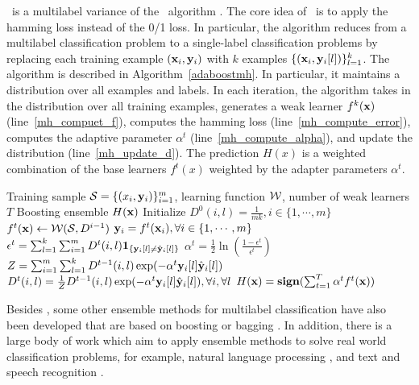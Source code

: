 {\adaboostmh\ is a multilabel variance of the \adaboost\ algorithm \citep{Schapire99improved,Esuli2008boosting}.
The core idea of \adaboostmh\ is to apply the hamming loss instead of the 0/1 loss. 
In particular, the algorithm reduces from a multilabel classification problem to a single-label classification problems by replacing each training example $(\mathbf {x}_i,\mathbf {y}_i)$ with $k$ examples $\{(\mathbf {x}_i,\mathbf {y}_i[l])\}_{l=1}^k$.
The algorithm is described in Algorithm~\ref{adaboostmh}.
In particular, it maintains a distribution over all examples and labels.
In each iteration, the algorithm takes in the distribution over all training examples, generates a weak learner $f^k(\mathbf {x})$ (line~\ref{mh_compuet_f}), computes the hamming loss (line~\ref{mh_compute_error}), computes the adaptive parameter $\alpha^t$ (line~\ref{mh_compute_alpha}), and update the distribution (line~\ref{mh_update_d}).
The prediction $H(x)$ is a weighted combination of the base learners $f^t(x)$ weighted by the adapter parameters $\alpha^t$.
\begin{algorithm}
\caption{\adaboostmh}
\label{adaboostmh}
\begin{algorithmic}[1]
	\REQUIRE Training sample $\mathcal{S} = \{(x_i,\mathbf {y}_i)\}_{i=1}^m$, learning function $\mathcal{W}$, number of weak learners $T$
	\ENSURE Boosting ensemble $H(\mathbf {x})$
	\STATE Initialize $D^0(i,l)=\frac{1}{mk},i\in\{1,\cdots,m\}$
		\STATE $f^t(\mathbf {x})\leftarrow\mathcal{W}(\mathcal{S},D^{i-1})$ \label{mh_compuet_f}
		\STATE $\mathbf {y}_i = f^t(\mathbf {x}_i),\forall i\in\{1,\cdots,m\}$
		\STATE $\epsilon^t =\sum_{l=1}^k\sum_{i=1}^{m}D^t(i,l)\mathbf{1}_{\{\mathbf {y}_i[l]\neq\hat{\mathbf {y}}_i[l]\}}$ \label{mh_compute_error}
		\STATE $\alpha^{t} = \frac{1}{2}\ln\left(\frac{1-\epsilon^t}{\epsilon^t}\right)$ \label{mh_compute_alpha}
		\STATE $Z=\sum_{i=1}^{m}\sum_{l=1}^{k}D^{t-1}(i,l)\exp(-\alpha^t\mathbf {y}_i[l]\hat{\mathbf {y}}_i[l])$
		\STATE $D^t(i,l) = \frac{1}{Z}D^{t-1}(i,l)\exp(-\alpha^t\mathbf {y}_i[l]\hat{\mathbf {y}}_i[l]),\forall i,\forall l$ \label{mh_update_d}
	\ENDFOR
	\RETURN $H(\mathbf {x}) = \textbf{sign}(\sum_{t=1}^T\alpha^tf^t(\mathbf {x}))$
\end{algorithmic}
\end{algorithm}

Besides \adaboostmh, some other ensemble methods for multilabel classification have also been developed that are based on boosting or bagging \citep{Wang07simple,Yan07model,Kocev13tree}.
In addition, there is a large body of work which aim to apply ensemble methods to solve real world classification problems, for example, natural language processing \citep{Collins05distrimnative,Zeman05improving,Sagae06parsing,Zhang09kbest}, and text and speech recognition \citep{Fiscus97a,Benesty08speech,Petrov10products}.


}
